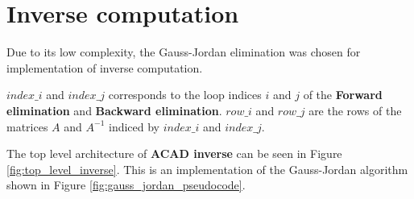 \section{Inverse computation}
\label{sec:inverse_computation_hw}
Due to its low complexity, the Gauss-Jordan elimination was chosen for implementation of inverse computation. 

$index\_i$ and $index\_j$ corresponds to the loop indices $i$ and $j$ of the \textbf{Forward elimination} and \textbf{Backward elimination}. $row\_i$ and $row\_j$ are the rows of the matrices $A$ and $A^{-1}$ indiced by $index\_i$ and $index\_j$.





The top level architecture of \textbf{ACAD inverse} can be seen in Figure \ref{fig:top_level_inverse}. This is an implementation of the Gauss-Jordan algorithm shown in Figure \ref{fig:gauss_jordan_pseudocode}. 



